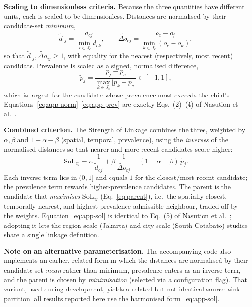 \documentclass[a4paper,11pt]{article}
\begin{document}
\noindent\textbf{Scaling to dimensionless criteria.} Because the three quantities
have different units, each is scaled to be dimensionless. Distances are normalised
by their candidate-set \emph{minimum},
\begin{equation}
\tilde d_{cj}=\frac{d_{cj}}{\min_{k\in J_c} d_{ck}},\qquad
\widetilde{\Delta o}_{cj}=\frac{o_c-o_j}{\min_{k\in J_c}(o_c-o_k)},
\label{eq:app-norm}
\end{equation}
so that $\tilde d_{cj},\widetilde{\Delta o}_{cj}\ge 1$, with equality for the
nearest (respectively, most recent) candidate. Prevalence is scaled as a signed,
normalised difference,
\begin{equation}
\tilde p_{j}=\frac{p_j-p_c}{\max_{k\in J_c}\lvert p_k-p_c\rvert}\in[-1,1],
\label{eq:app-prev}
\end{equation}
which is largest for the candidate whose prevalence most exceeds the child's.
Equations~\eqref{eq:app-norm}--\eqref{eq:app-prev} are exactly Eqs.~(2)--(4) of
Nasution et al.\ \cite{Nasution2024}.

\noindent\textbf{Combined criterion.} The Strength of Linkage combines the three,
weighted by $\alpha,\beta$ and $1-\alpha-\beta$ (spatial, temporal, prevalence),
using the \emph{inverses} of the normalised distances so that nearer and more
recent candidates score higher:
\begin{equation}
\mathrm{SoL}_{cj}=\alpha\,\frac{1}{\tilde d_{cj}}
+\beta\,\frac{1}{\widetilde{\Delta o}_{cj}}
+(1-\alpha-\beta)\,\tilde p_{j}.
\label{eq:app-sol}
\end{equation}
Each inverse term lies in $(0,1]$ and equals $1$ for the closest/most-recent
candidate; the prevalence term rewards higher-prevalence candidates. The parent is
the candidate that \emph{maximises} $\mathrm{SoL}_{cj}$
(Eq.~\ref{eq:parent}), i.e.\ the spatially closest, temporally nearest, and
highest-prevalence admissible neighbour, traded off by the weights.
Equation~\eqref{eq:app-sol} is identical to Eq.~(5) of Nasution et al.\
\cite{Nasution2024}; adopting it lets the region-scale (Jakarta) and city-scale
(South Cotabato) studies share a single linkage definition.

\noindent\textbf{Note on an alternative parameterisation.} The accompanying code
also implements an earlier, related form in which the distances are normalised by
their candidate-set \emph{mean} rather than minimum, prevalence enters as an inverse
term, and the parent is chosen by \emph{minimisation} (selected via a configuration
flag). That variant, used during development, yields a related but not identical
source--sink partition; all results reported here use the harmonised
form~\eqref{eq:app-sol}.
\end{document}
